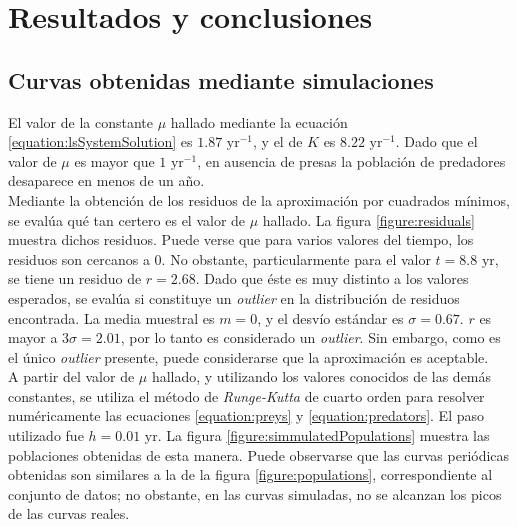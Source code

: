 \documentclass[journal, monochrome]{IEEEtran}
\begin{document}
\vspace{0.5cm}
\section{Resultados y conclusiones}
\label{section:results}

\subsection{Curvas obtenidas mediante simulaciones}

El valor de la constante $\mu$ hallado mediante la ecuación \ref{equation:lsSystemSolution} es $1.87 \text{ yr}^{-1}$, y el de $K$ es $8.22 \text{ yr}^{-1}$. Dado que el valor de $\mu$ es mayor que $1 \text{ yr}^{-1}$, 
en ausencia de presas la población de predadores desaparece en menos de un año.\\

Mediante la obtención de los residuos de la aproximación por cuadrados mínimos, se evalúa qué tan certero es el valor de $\mu$ hallado. La figura \ref{figure:residuals} muestra dichos residuos. 
Puede verse que para varios valores del tiempo, los residuos son cercanos a $0$. No obstante, particularmente para el valor $t = 8.8 \text{ yr}$, se tiene un residuo de $r = 2.68$. Dado que éste es muy distinto a los valores esperados, se evalúa si constituye un \textit{outlier} en la distribución de residuos encontrada. La media muestral es $m = 0$, y el desvío estándar es $\sigma = 0.67$. $r$ es mayor a $3 \sigma = 2.01$, por lo tanto es considerado un \textit{outlier}. Sin embargo, como es el único \textit{outlier} presente, puede considerarse que la aproximación es aceptable.\\



A partir del valor de $\mu$ hallado, y utilizando los valores conocidos de las demás constantes, se utiliza el método de \textit{Runge-Kutta} de cuarto orden \citep{mathews} para resolver numéricamente las ecuaciones 
\ref{equation:preys} y \ref{equation:predators}. El paso utilizado fue $h = 0.01 \text{ yr}$. La figura \ref{figure:simmulatedPopulations} muestra las poblaciones obtenidas de esta manera. Puede observarse que las curvas periódicas obtenidas 
son similares a la de la figura \ref{figure:populations}, correspondiente al conjunto de datos; no obstante, en las curvas simuladas, no se alcanzan los picos de las curvas reales.\\
\end{document}

